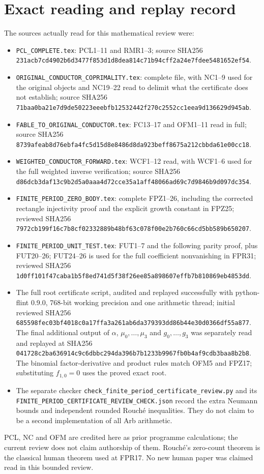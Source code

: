 \documentclass[11pt]{article}
\begin{document}
\section{Exact reading and replay record}
The sources actually read for this mathematical review were:
\begin{itemize}
\item \texttt{PCL\_COMPLETE.tex}: PCL1--11 and RMR1--3;
source SHA256
\texttt{231acb7cd4902b6d3477f853d1d8dea814c71b94cff2a24e7fdee5481652ef54}.
\item \texttt{ORIGINAL\_CONDUCTOR\_COPRIMALITY.tex}: complete
file, with NC1--9 used for the original objects and NC19--22
read to delimit what the certificate does not establish;
source SHA256
\texttt{71baa0ba21e7d9de50223eeebfb12532442f270c2552cc1eea9d136629d945ab}.
\item \texttt{FABLE\_TO\_ORIGINAL\_CONDUCTOR.tex}: FC13--17
and OFM1--11 read in full;
source SHA256
\texttt{8739afeab8d76ebfa4fc5d15d8e8486d8da923beff8675a212cbbda61e00cc18}.
\item \texttt{WEIGHTED\_CONDUCTOR\_FORWARD.tex}: WCF1--12
read, with WCF1--6 used for the full weighted inverse verification;
source SHA256
\texttt{d86dcb3daf13c9b2d5a0aaa4d72cce35a1aff48066ad69c7d9846b9d097dc354}.
\item \texttt{FINITE\_PERIOD\_ZERO\_BODY.tex}: complete FPZ1--26,
including the corrected rectangle injectivity proof and the explicit
growth constant in FPZ25; reviewed SHA256
\texttt{7972cb199f16c7b8cf02332889b48bf63c078f00e2b760c66cd5bb589b650207}.
\item \texttt{FINITE\_PERIOD\_UNIT\_TEST.tex}: FUT1--7 and
the following parity proof, plus FUT20--26; FUT24--26 is used
for the full coefficient nonvanishing in FPR31; reviewed SHA256
\texttt{1d0ff101f47caba1b5f8ed741d5f38f26ee85a898607effb7b810869eb4853dd}.
\item The full root certificate script, audited and replayed
successfully with python-flint 0.9.0, 768-bit working precision
and one arithmetic thread; initial reviewed SHA256
\texttt{685598fec03bf4018c0a17ffa3a261ab6da379393dd86b44e30d0366df55a877}.
The final additional output of $\alpha$, $\mu_0,\ldots,\mu_3$
and $g_0,\ldots,g_3$ was separately read and replayed at SHA256
\texttt{041728c2ba636914c9c6dbbc294da396b7b1233b9967fb0b4af9cdb3baa8b2b8}.
The binomial factor-derivative and product rules match OFM5
and FPZ17; substituting $f_{1,0}=0$ uses the proved exact root.
\item The separate checker
\texttt{check\_finite\_period\_certificate\_review.py} and its
\texttt{FINITE\_PERIOD\_CERTIFICATE\_REVIEW\_CHECK.json}
record the extra Neumann bounds and independent rounded
Rouch\'e inequalities. They do not claim to be a second
implementation of all Arb arithmetic.
\end{itemize}
PCL, NC and OFM are credited here as prior programme calculations;
the current review does not claim authorship of them. Rouch\'e's
zero-count theorem is the classical human theorem used at FPR17.
No new human paper was claimed read in this bounded review.
\end{document}
